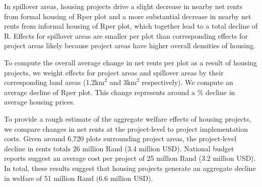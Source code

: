 \documentclass[12pt]{article}
\begin{document}
In spillover areas, housing projects drive a slight decrease in nearby net rents from formal housing of Rper plot and a more substantial decrease in nearby net rents from informal housing of Rper plot, which together lead to a total decline of R\unskip.  Effects for spillover areas are smaller per plot than corresponding effects for project areas likely because project areas have higher overall densities of housing.

To compute the overall average change in net rents per plot as a result of housing projects, we weight effects for project areas and spillover areas by their corresponding land areas (1.2$\text{km}^{2}$ and 3$\text{km}^{2}$ respectively).  We compute an average decline of Rper plot.  This change represents around a \unskip\% decline in average housing prices.  

To provide a rough estimate of the aggregate welfare effects of housing projects, we compare changes in net rents at the project-level to project implementation costs.  Given around 6,720 plots surrounding project areas, the project-level decline in rents totals 26 million Rand (3.4 million USD).  National budget reports suggest an average cost per project of 25 million Rand (3.2 million USD).  In total, these results suggest that housing projects generate an aggregate decline in welfare of 51 million Rand (6.6 million USD).

\end{document}

